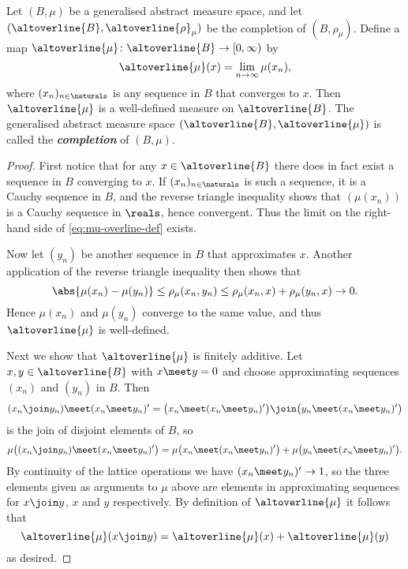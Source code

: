 \documentclass[article, a4paper, 11pt, oneside]{memoir}
\numberwithin{equation}{chapter}
\newcommand{\keyword}[1]{{\itshape\bfseries #1}}
\begin{document}
\begin{proposition}
    Let $(B,\mu)$ be a generalised abstract measure space, and let $(\altoverline{B}, \altoverline{\rho}_\mu)$ be the completion of $(B,\rho_\mu)$. Define a map $\altoverline{\mu} \colon \altoverline{B} \to [0,\infty)$ by
    \begin{equation}
        \label{eq:mu-overline-def}
        \altoverline{\mu}(x) = \lim_{n\to\infty} \mu(x_n),
    \end{equation}
    where $(x_n)_{n\in\naturals}$ is any sequence in $B$ that converges to $x$. Then $\altoverline{\mu}$ is a well-defined measure on $\altoverline{B}$. The generalised abstract measure space $(\altoverline{B}, \altoverline{\mu})$ is called the \keyword{completion} of $(B,\mu)$.
\end{proposition}

\begin{proof}
    First notice that for any $x \in \altoverline{B}$ there does in fact exist a sequence in $B$ converging to $x$. If $(x_n)_{n\in\naturals}$ is such a sequence, it is a Cauchy sequence in $B$, and the reverse triangle inequality shows that $(\mu(x_n))$ is a Cauchy sequence in $\reals$, hence convergent. Thus the limit on the right-hand side of \eqref{eq:mu-overline-def} exists.
    
    Now let $(y_n)$ be another sequence in $B$ that approximates $x$. Another application of the reverse triangle inequality then shows that
    \begin{equation*}
        \abs{ \mu(x_n) - \mu(y_n) }
            \leq \rho_\mu(x_n,y_n)
            \leq \rho_\mu(x_n,x) + \rho_\mu(y_n,x)
            \to 0.
    \end{equation*}
    Hence $\mu(x_n)$ and $\mu(y_n)$ converge to the same value, and thus $\altoverline{\mu}$ is well-defined.

    Next we show that $\altoverline{\mu}$ is finitely additive. Let $x,y \in \altoverline{B}$ with $x \meet y = 0$ and choose approximating sequences $(x_n)$ and $(y_n)$ in $B$. Then
    \begin{equation*}
        (x_n \join y_n) \meet (x_n \meet y_n)'
            = \bigl( x_n \meet (x_n \meet y_n)' \bigr)
              \join \bigl( y_n \meet (x_n \meet y_n)' \bigr)
    \end{equation*}
    is the join of disjoint elements of $B$, so
    \begin{equation*}
        \mu \bigl( (x_n \join y_n) \meet (x_n \meet y_n)' \bigr)
            = \mu \bigl( x_n \meet (x_n \meet y_n)' \bigr)
              + \mu \bigl( y_n \meet (x_n \meet y_n)' \bigr).
    \end{equation*}
    By continuity of the lattice operations we have $(x_n \meet y_n)' \to 1$, so the three elements given as arguments to $\mu$ above are elements in approximating sequences for $x \join y$, $x$ and $y$ respectively. By definition of $\altoverline{\mu}$ it follows that
    \begin{equation*}
        \altoverline{\mu}(x \join y)
            = \altoverline{\mu}(x) + \altoverline{\mu}(y)
    \end{equation*}
    as desired.
\end{proof}
\end{document}
